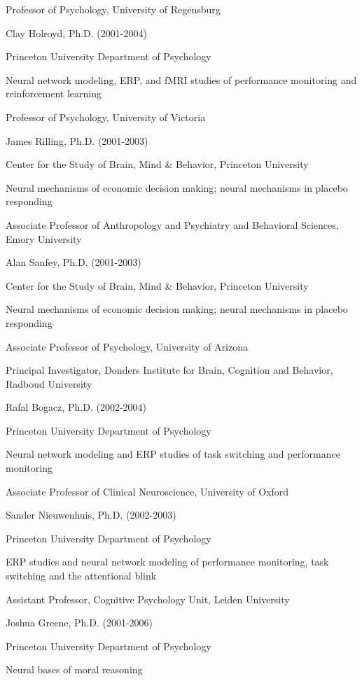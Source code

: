\documentclass[10 pt]{article}
\begin{document}
Professor of Psychology, University of Regensburg
    \medskip

Clay Holroyd, Ph.D. (2001-2004)

Princeton University Department of Psychology

Neural network modeling, ERP, and fMRI studies of performance monitoring and reinforcement learning

Professor of Psychology, University of Victoria
    \medskip

James Rilling, Ph.D. (2001-2003)

Center for the Study of Brain, Mind \& Behavior, Princeton University

Neural mechanisms of economic decision making; neural mechanisms in placebo responding

Associate Professor of Anthropology and Psychiatry and Behavioral Sciences, Emory University
    \medskip

Alan Sanfey, Ph.D. (2001-2003)

Center for the Study of Brain, Mind \& Behavior, Princeton University

Neural mechanisms of economic decision making; neural mechanisms in placebo responding

Associate Professor of Psychology, University of Arizona

Principal Investigator, Donders Institute for Brain, Cognition and Behavior, Radboud University
    \medskip

Rafal Bogacz, Ph.D. (2002-2004)

Princeton University Department of Psychology

Neural network modeling and ERP studies of task switching and performance monitoring

Associate Professor of Clinical Neuroscience, University of Oxford
    \medskip

Sander Nieuwenhuis, Ph.D. (2002-2003)

Princeton University Department of Psychology

ERP studies and neural network modeling of performance monitoring, task switching and the attentional blink

Assistant Professor, Cognitive Psychology Unit, Leiden University
    \medskip

Joshua Greene, Ph.D. (2001-2006)

Princeton University Department of Psychology

Neural bases of moral reasoning
\end{document}

